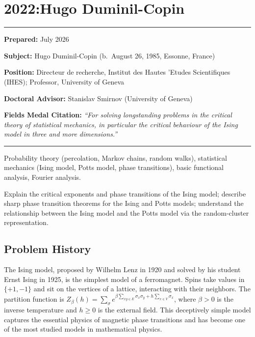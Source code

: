 \chapter{2022:Hugo Duminil-Copin}\label{ch2022hugoduminilcopin:hugo-duminil-copin-fields-medal-2022-a-comprehensive-report-on-his-work-and-impact}

\begin{center}\rule{0.5\linewidth}{0.5pt}\end{center}

\textbf{Prepared:} July 2026

\textbf{Subject:} Hugo Duminil-Copin (b.\ August 26, 1985, Essonne, France)

\textbf{Position:} Directeur de recherche, Institut des Hautes 'Etudes Scientifiques (IHES); Professor, University of Geneva

\textbf{Doctoral Advisor:} Stanislav Smirnov (University of Geneva)

\textbf{Fields Medal Citation:} \emph{``For solving longstanding problems in the critical theory of statistical mechanics, in particular the critical behaviour of the Ising model in three and more dimensions.''}

\begin{center}\rule{0.5\linewidth}{0.5pt}\end{center}

\begin{prereqs}
Probability theory (percolation, Markov chains, random walks), statistical mechanics (Ising model, Potts model, phase transitions), basic functional analysis, Fourier analysis.
\end{prereqs}

\begin{objectives}
Explain the critical exponents and phase transitions of the Ising model; describe sharp phase transition theorems for the Ising and Potts models; understand the relationship between the Ising model and the Potts model via the random-cluster representation.
\end{objectives}

\section{Problem History}

The Ising model, proposed by Wilhelm Lenz in 1920 and solved by his student Ernst Ising in 1925, is the simplest model of a ferromagnet. Spins take values in $\{+1, -1\}$ and sit on the vertices of a lattice, interacting with their neighbors. The partition function is $Z_{\beta}(h) = \sum_{\sigma} e^{\beta \sum_{xy \in E} \sigma_x \sigma_y + h \sum_{x \in V} \sigma_x}$, where $\beta > 0$ is the inverse temperature and $h \ge 0$ is the external field. This deceptively simple model captures the essential physics of magnetic phase transitions and has become one of the most studied models in mathematical physics.


